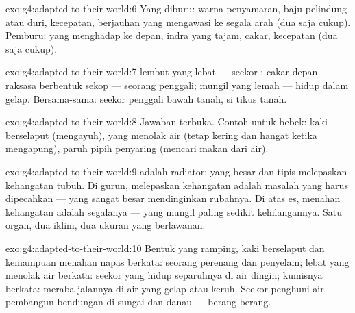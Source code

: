 \begin{solution}{exo:g4:adapted-to-their-world:6}
Yang diburu: warna penyamaran, baju pelindung atau duri, kecepatan,
 berjauhan yang mengawasi ke segala arah (dua saja cukup). Pemburu:
 yang menghadap ke depan, indra yang tajam, cakar, kecepatan (dua
saja cukup).
\end{solution}

\begin{solution}{exo:g4:adapted-to-their-world:7}
 lembut yang lebat --- seekor ; cakar depan raksasa
berbentuk sekop --- seorang penggali;  mungil yang lemah --- hidup
dalam gelap. Bersama-sama: seekor  penggali bawah tanah, si
tikus tanah.
\end{solution}

\begin{solution}{exo:g4:adapted-to-their-world:8}
Jawaban terbuka. Contoh untuk bebek: kaki berselaput (mengayuh), 
yang menolak air (tetap kering dan hangat ketika mengapung), paruh
pipih penyaring (mencari makan dari air).
\end{solution}

\begin{solution}{exo:g4:adapted-to-their-world:9}
 adalah radiator:  yang besar dan tipis melepaskan
kehangatan tubuh. Di gurun, melepaskan kehangatan adalah masalah yang
harus dipecahkan ---  yang sangat besar mendinginkan rubahnya.
Di atas es, menahan kehangatan adalah segalanya ---  yang
mungil paling sedikit kehilangannya. Satu organ, dua iklim, dua ukuran
yang berlawanan.
\end{solution}

\begin{solution}{exo:g4:adapted-to-their-world:10}
Bentuk yang ramping, kaki berselaput dan kemampuan menahan napas
berkata: seorang perenang dan penyelam;  lebat yang menolak air
berkata: seekor  yang hidup separuhnya di air dingin; kumisnya
berkata: meraba jalannya di air yang gelap atau keruh. Seekor 
penghuni air pembangun bendungan di sungai dan danau --- berang-berang.
\end{solution}

